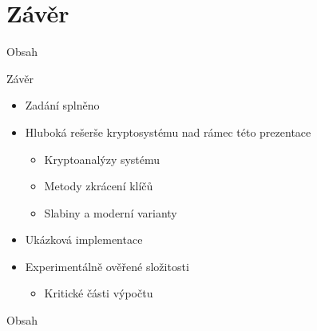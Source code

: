 \documentclass{beamer}
\begin{document}
\section{Závěr}
\begin{frame}{Obsah}
    \tableofcontents[currentsection]
\end{frame}

\begin{frame}{Závěr}

    \begin{itemize}
        \item Zadání splněno

            \pause
        \item Hluboká rešerše kryptosystému nad rámec této prezentace
            \begin{itemize}
                \item Kryptoanalýzy systému
                \item Metody zkrácení klíčů
                \item Slabiny a moderní varianty
            \end{itemize}

            \pause
        \item Ukázková implementace

            \pause
        \item Experimentálně ověřené složitosti
            \begin{itemize}
                \item Kritické části výpočtu
            \end{itemize}

    \end{itemize}
\end{frame}

\begin{frame}{Obsah}
    \tableofcontents
\end{frame}


\appendix
\end{document}
